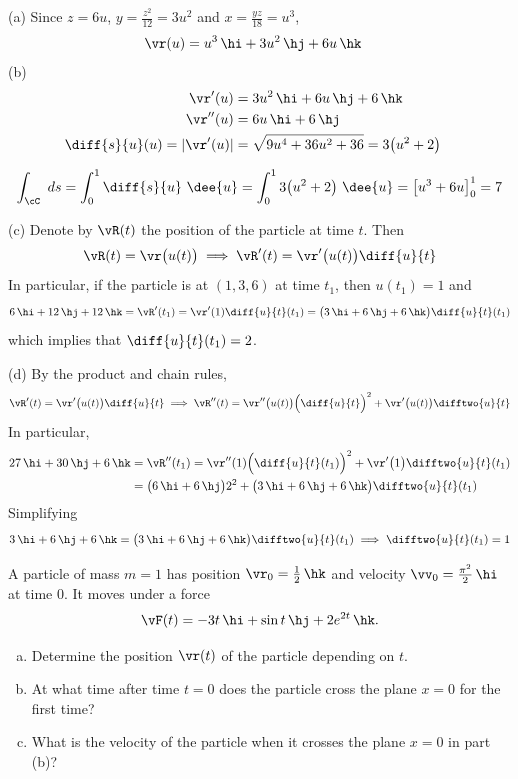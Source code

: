 \begin{solution}
(a) 
Since $z=6u$, $y=\frac{z^2}{12}=3u^2$ and $x=\frac{yz}{18}=u^3$,
\begin{align*}
\vr(u)&=u^3\,\hi+3u^2\,\hj+6u\,\hk\cr
\end{align*}
(b)
\begin{align*}
\vr'(u)&=3u^2\,\hi+6u\,\hj+6\,\hk\cr
\vr''(u)&=6u\,\hi+6\,\hj\cr
\diff{s}{u}(u)=|\vr'(u)|
&=\sqrt{9u^4+36u^2+36}=3\big(u^2+2\big)\cr
\end{align*}


$$
\int_\cC \ ds
=\int_0^1 \diff{s}{u}\ \dee{u}
=\int_0^1 3\big(u^2+2\big)\ \dee{u}
=\big[u^3+6u\big]_0^1
=7
$$

(c) Denote by $\vR(t)$ the position of the particle at time $t$.
Then
$$
\vR(t)=\vr\big(u(t)\big)\implies
\vR'(t)=\vr'\big(u(t)\big)\diff{u}{t}
$$
In particular, if the particle is at $(1,3,6)$ at time $t_1$, then $u(t_1)=1$
and
$$
6\,\hi+12\,\hj+12\,\hk=\vR'(t_1)=\vr'(1)\diff{u}{t}(t_1)
=\big(3\,\hi+6\,\hj+6\,\hk\big)\diff{u}{t}(t_1)
$$
which implies that $\diff{u}{t}(t_1)=2$.

(d) By the product and chain rules,
$$
\vR'(t)=\vr'\big(u(t)\big)\diff{u}{t}\implies
\vR''(t)=\vr''\big(u(t)\big)\Big(\diff{u}{t}\Big)^2
+\vr'\big(u(t)\big)\difftwo{u}{t}
$$
In particular,
\begin{align*}
27\,\hi+30\,\hj+6\,\hk
&=\vR''(t_1)=\vr''(1)\Big(\diff{u}{t}(t_1)\Big)^2
+\vr'\big(1\big)\difftwo{u}{t}(t_1) \\
&=\big(6\,\hi+6\,\hj\big)2^2+\big(3\,\hi+6\,\hj+6\,\hk\big)\difftwo{u}{t}(t_1)
\end{align*}
Simplifying
$$
3\,\hi+6\,\hj+6\,\hk
=\big(3\,\hi+6\,\hj+6\,\hk\big)\difftwo{u}{t}(t_1)
\implies \difftwo{u}{t}(t_1)=1
$$
\end{solution}


\begin{question}[M317 2008A] %
A particle of mass $m = 1$ has position $\vr_0 = \frac{1}{2}\,\hk$ 
and velocity $\vv_0 =\frac{\pi^2}{2}\,\hi$ at time $0$.
It moves under a force
\begin{equation*}
\vF(t) = -3t\,\hi + \sin t\,\hj + 2e^{2t}\,\hk.
\end{equation*}
\begin{enumerate}[(a)]
\item
Determine the position $\vr(t)$ of the particle depending on $t$.
\item
At what time after time $t = 0$ does the particle cross the plane 
$x = 0$ for the first time?
\item
What is the velocity of the particle when it crosses the plane $x = 0$ 
in part (b)?
\end{enumerate}
\end{question}

